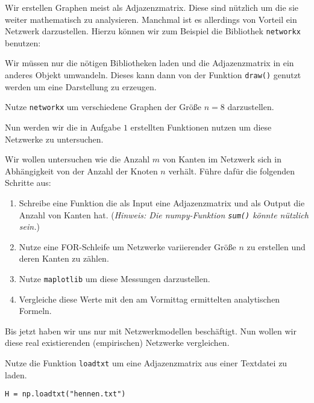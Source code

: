 \exercise[%
  topic=Netzwerke mit Python darstellen
    ]

Wir erstellen Graphen meist als Adjazenzmatrix. Diese sind n\"utzlich um die sie weiter mathematisch zu analysieren. Manchmal ist es allerdings von Vorteil ein Netzwerk darzustellen. Hierzu k\"onnen wir zum Beispiel die Bibliothek {\tt networkx} benutzen:  



Wir m\"ussen nur die n\"otigen Bibliotheken laden und die Adjazenzmatrix in ein anderes Objekt umwandeln. Dieses kann dann von der Funktion {\tt draw()} genutzt werden um eine Darstellung zu erzeugen.

Nutze {\tt networkx} um verschiedene Graphen der Gr\"o\ss e $n=8$ darzustellen.

  \exercise[%
  topic=Netzwerke mit Python untersuchen
    ]
Nun werden wir die in Aufgabe $1$ erstellten Funktionen nutzen um diese Netzwerke zu untersuchen.

 \subexercise[%
  topic=Kanten z\"ahlen,
    ]

Wir wollen untersuchen wie die Anzahl $m$ von Kanten im Netzwerk sich in Abh\"angigkeit von der Anzahl der Knoten $n$ verh\"alt. F\"uhre daf\"ur die folgenden Schritte aus:

\begin{enumerate}
\item Schreibe eine Funktion die als Input eine Adjazenzmatrix und als Output die Anzahl von Kanten hat. (\emph{Hinweis: Die numpy-Funktion {\tt sum()} k\"onnte n\"utzlich sein.})
\item Nutze eine FOR-Schleife um Netzwerke variierender Gr\"o\ss e $n$ zu erstellen und deren Kanten zu z\"ahlen.
\item Nutze {\tt maplotlib} um diese Messungen darzustellen. 
\item Vergleiche diese Werte mit den am Vormittag ermittelten analytischen Formeln.
\end{enumerate}



 \subexercise[%
  topic=Vergleich mit empirischen Netzwerken,
    ]

Bis jetzt haben wir uns nur mit Netzwerkmodellen besch\"aftigt. Nun wollen wir diese real existierenden (empirischen) Netzwerke vergleichen.

Nutze die Funktion {\tt loadtxt} um eine Adjazenzmatrix aus einer Textdatei zu laden.

\begin{lstlisting}
H = np.loadtxt("hennen.txt")
\end{lstlisting}

